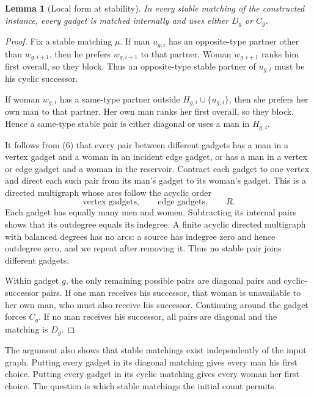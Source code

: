 \documentclass[11pt,letterpaper]{article}
\newtheorem{lemma}{Lemma}
\theoremstyle{definition}
\begin{document}
\begin{lemma}[Local form at stability]
In every stable matching of the constructed instance, every gadget is matched internally and uses either $D_g$ or $C_g$.
\end{lemma}
\begin{proof}
Fix a stable matching $\mu$. If man $u_{g,i}$ has an opposite-type partner other than $w_{g,i+1}$, then he prefers $w_{g,i+1}$ to that partner. Woman $w_{g,i+1}$ ranks him first overall, so they block. Thus an opposite-type stable partner of $u_{g,i}$ must be his cyclic successor.

If woman $w_{g,i}$ has a same-type partner outside $H_{g,i}\cup\{u_{g,i}\}$, then she prefers her own man to that partner. Her own man ranks her first overall, so they block. Hence a same-type stable pair is either diagonal or uses a man in $H_{g,i}$.

It follows from (6) that every pair between different gadgets has a man in a vertex gadget and a woman in an incident edge gadget, or has a man in a vertex or edge gadget and a woman in the reservoir. Contract each gadget to one vertex and direct each such pair from its man's gadget to its woman's gadget. This is a directed multigraph whose arcs follow the acyclic order
\[
\text{vertex gadgets},\qquad\text{edge gadgets},\qquad R.
\]
Each gadget has equally many men and women. Subtracting its internal pairs shows that its outdegree equals its indegree. A finite acyclic directed multigraph with balanced degrees has no arcs: a source has indegree zero and hence outdegree zero, and we repeat after removing it. Thus no stable pair joins different gadgets.

Within gadget $g$, the only remaining possible pairs are diagonal pairs and cyclic-successor pairs. If one man receives his successor, that woman is unavailable to her own man, who must also receive his successor. Continuing around the gadget forces $C_g$. If no man receives his successor, all pairs are diagonal and the matching is $D_g$.
\end{proof}

The argument also shows that stable matchings exist independently of the input graph. Putting every gadget in its diagonal matching gives every man his first choice. Putting every gadget in its cyclic matching gives every woman her first choice. The question is which stable matchings the initial count permits.
\end{document}
